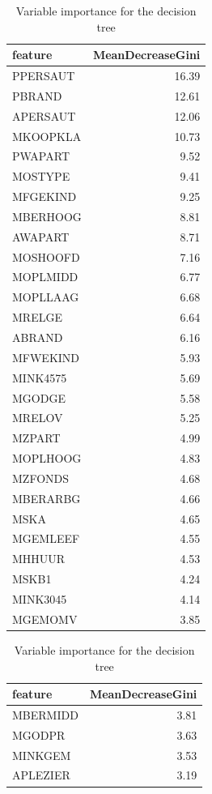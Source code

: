 \documentclass[
  12pt,
  oneside]{report}
\begin{document}
\begin{table}[H]
\caption{\label{tab:DT}Variable importance for the decision tree}

\centering
\fontsize{9}{11}\selectfont
\begin{tabular}[t]{l|r}
\hline
feature & MeanDecreaseGini\\
\hline
PPERSAUT & 16.39\\
\hline
PBRAND & 12.61\\
\hline
APERSAUT & 12.06\\
\hline
MKOOPKLA & 10.73\\
\hline
PWAPART & 9.52\\
\hline
MOSTYPE & 9.41\\
\hline
MFGEKIND & 9.25\\
\hline
MBERHOOG & 8.81\\
\hline
AWAPART & 8.71\\
\hline
MOSHOOFD & 7.16\\
\hline
MOPLMIDD & 6.77\\
\hline
MOPLLAAG & 6.68\\
\hline
MRELGE & 6.64\\
\hline
ABRAND & 6.16\\
\hline
MFWEKIND & 5.93\\
\hline
MINK4575 & 5.69\\
\hline
MGODGE & 5.58\\
\hline
MRELOV & 5.25\\
\hline
MZPART & 4.99\\
\hline
MOPLHOOG & 4.83\\
\hline
MZFONDS & 4.68\\
\hline
MBERARBG & 4.66\\
\hline
MSKA & 4.65\\
\hline
MGEMLEEF & 4.55\\
\hline
MHHUUR & 4.53\\
\hline
MSKB1 & 4.24\\
\hline
MINK3045 & 4.14\\
\hline
MGEMOMV & 3.85\\
\hline
\end{tabular}
\centering
\begin{tabular}[t]{l|r}
\hline
feature & MeanDecreaseGini\\
\hline
MBERMIDD & 3.81\\
\hline
MGODPR & 3.63\\
\hline
MINKGEM & 3.53\\
\hline
APLEZIER & 3.19\\

\end{tabular}
\end{table}
\end{document}
